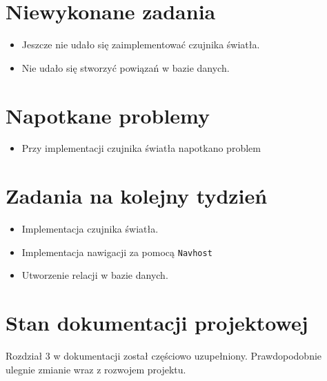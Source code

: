 \documentclass[12pt,a4paper]{mwart}
\begin{document}
\section{Niewykonane zadania}

\begin{itemize}
	\item Jeszcze nie udało się zaimplementować czujnika światła.
	
	\item Nie udało się stworzyć powiązań w bazie danych.
\end{itemize}

\section{Napotkane problemy}

\begin{itemize}
	\item Przy implementacji czujnika światła napotkano problem
\end{itemize}

\section{Zadania na kolejny tydzień}

\begin{itemize}
	\item Implementacja czujnika światła.
	
	\item Implementacja nawigacji za pomocą \texttt{Navhost}
	
	\item Utworzenie relacji w bazie danych.
\end{itemize}

\section{Stan dokumentacji projektowej}

Rozdział 3 w dokumentacji został częściowo uzupełniony. Prawdopodobnie ulegnie zmianie wraz z rozwojem projektu.
\end{document}

